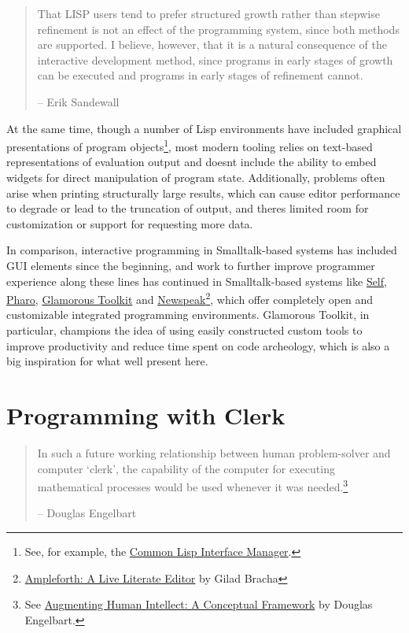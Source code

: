 \documentclass[sigconf,screen]{acmart}
\begin{document}
\begin{quote}
That LISP users tend to prefer structured growth rather than stepwise refinement is not an effect of the programming system, since both methods are supported. I believe, however, that it is a natural consequence of the interactive development method, since programs in early stages of growth can be executed and programs in early stages of refinement cannot. \cite{Sandewall_1978}

-- Erik Sandewall
\end{quote}

At the same time, though a number of Lisp environments have included graphical presentations of program objects\footnote{See, for example, the \href{https://en.wikipedia.org/wiki/Common_Lisp_Interface_Manager}{Common Lisp Interface Manager}.}, most modern tooling relies on text-based representations of evaluation output and doesn\textquotesingle t include the ability to embed widgets for direct manipulation of program state. Additionally, problems often arise when printing structurally large results, which can cause editor performance to degrade or lead to the truncation of output, and there\textquotesingle s limited room for customization or support for requesting more data.

In comparison, interactive programming in Smalltalk-based systems has included GUI elements since the beginning, and work to further improve programmer experience along these lines has continued in Smalltalk-based systems like \href{https://selflanguage.org}{Self}, \href{https://pharo.org}{Pharo}, \href{https://gtoolkit.com}{Glamorous Toolkit} \cite{Chi__2015} and \href{https://newspeaklanguage.org}{Newspeak}\footnote{\href{https://blog.bracha.org/Ampleforth-Live22/out/primordialsoup.html?snapshot=Live22Submission.vfuel}{Ampleforth: A Live Literate Editor} by Gilad Bracha}, which offer completely open and customizable integrated programming environments. Glamorous Toolkit, in particular, champions the idea of using easily constructed custom tools to improve productivity and reduce time spent on code archeology, which is also a big inspiration for what we\textquotesingle ll present here.

\hypertarget{programming-with-clerk}{%
\section{Programming with Clerk}\label{programming-with-clerk}}

\begin{quote}
In such a future working relationship between human problem-solver and computer `clerk', the capability of the computer for executing mathematical processes would be used whenever it was needed.\footnote{See \href{https://www.dougengelbart.org/pubs/augment-3906.html}{Augmenting Human Intellect: A Conceptual Framework} by Douglas Engelbart.}

-- Douglas Engelbart
\end{quote}
\end{document}
